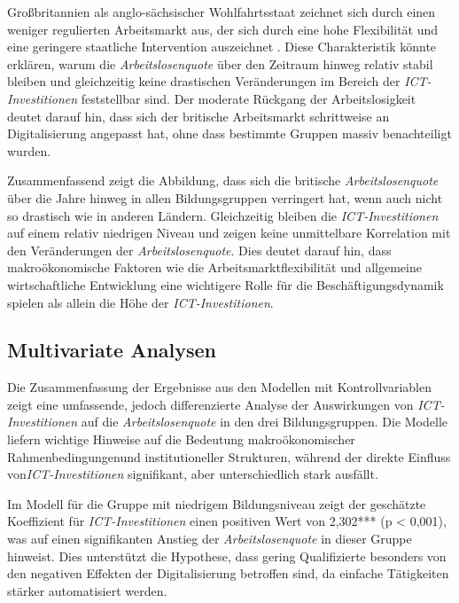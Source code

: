 Großbritannien als anglo-sächsischer Wohlfahrtsstaat zeichnet sich durch einen weniger 
regulierten Arbeitsmarkt aus, der sich durch eine hohe Flexibilität und eine geringere staatliche 
Intervention auszeichnet \parencite[vgl.][S. 21]{trabert1997entwicklung}. Diese Charakteristik 
könnte erklären, warum die \textit{Arbeitslosenquote} über den Zeitraum hinweg relativ stabil 
bleiben und gleichzeitig keine drastischen Veränderungen im Bereich der 
\textit{\ac{ICT}-Investitionen} feststellbar sind. Der moderate Rückgang der Arbeitslosigkeit 
deutet darauf hin, dass sich der britische Arbeitsmarkt schrittweise an Digitalisierung angepasst 
hat, ohne dass bestimmte Gruppen massiv benachteiligt wurden.

Zusammenfassend zeigt die Abbildung, dass sich die britische \textit{Arbeitslosenquote} über die 
Jahre hinweg in allen Bildungsgruppen verringert hat, wenn auch nicht so drastisch wie in anderen 
Ländern. Gleichzeitig bleiben die \textit{\ac{ICT}-Investitionen} auf einem relativ niedrigen 
Niveau und zeigen keine unmittelbare Korrelation mit den Veränderungen der 
\textit{Arbeitslosenquote}. Dies deutet darauf hin, dass makroökonomische Faktoren wie die 
Arbeitsmarktflexibilität und allgemeine wirtschaftliche Entwicklung eine wichtigere Rolle für die 
Beschäftigungsdynamik spielen als allein die Höhe der \textit{\ac{ICT}-Investitionen}.


\subsection{Multivariate Analysen}

Die Zusammenfassung der Ergebnisse aus den Modellen mit Kontrollvariablen zeigt eine umfassende, 
jedoch differenzierte Analyse der Auswirkungen von \textit{\ac{ICT}-Investitionen} auf die 
\textit{Arbeitslosenquote} in den drei Bildungsgruppen. Die Modelle liefern wichtige Hinweise auf 
die Bedeutung makroökonomischer Rahmenbedingungenund institutioneller Strukturen, während der 
direkte Einfluss von\textit{\ac{ICT}-Investitionen} signifikant, aber unterschiedlich stark 
ausfällt.



Im Modell für die Gruppe mit niedrigem Bildungsniveau zeigt der geschätzte Koeffizient für 
\textit{\ac{ICT}-Investitionen} einen positiven Wert von 2,302*** (p < 0,001), was auf einen 
signifikanten Anstieg der \textit{Arbeitslosenquote} in dieser Gruppe hinweist. Dies unterstützt 
die Hypothese, dass gering Qualifizierte besonders von den negativen Effekten der Digitalisierung 
betroffen sind, da einfache Tätigkeiten stärker automatisiert werden.

